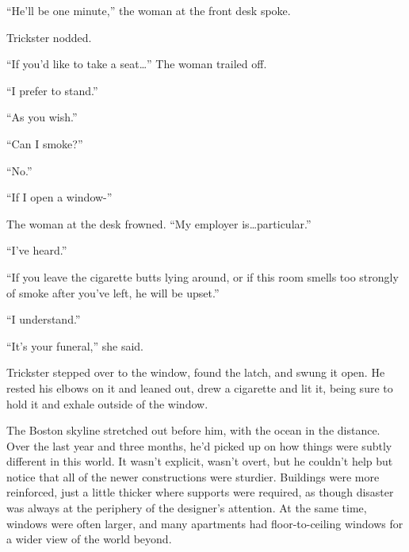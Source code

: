 





``He'll be one minute,'' the woman at the front desk spoke.



Trickster nodded.



``If you'd like to take a seat\ldots''  The woman trailed off.



``I prefer to stand.''



``As you wish.''



``Can I smoke?''



``No.''



``If I open a window-''



The woman at the desk frowned.  ``My employer is\ldots particular.''



``I've heard.''



``If you leave the cigarette butts lying around, or if this room smells too strongly of smoke after you've left, he will be upset.''



``I understand.''



``It's your funeral,'' she said.



Trickster stepped over to the window, found the latch, and swung it open.  He rested his elbows on it and leaned out, drew a cigarette and lit it, being sure to hold it and exhale outside of the window.



The Boston skyline stretched out before him, with the ocean in the distance.  Over the last year and three months, he'd picked up on how things were subtly different in this world.  It wasn't explicit, wasn't overt, but he couldn't help but notice that all of the newer constructions were sturdier.  Buildings were more reinforced, just a little thicker where supports were required, as though disaster was always at the periphery of the designer's attention.  At the same time, windows were often larger, and many apartments had floor-to-ceiling windows for a wider view of the world beyond.



